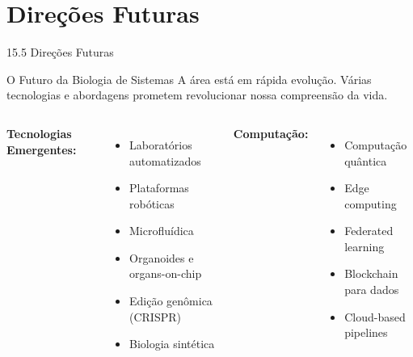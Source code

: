 \section{Direções Futuras}

\begin{frame}{15.5 Direções Futuras}
\begin{block}{O Futuro da Biologia de Sistemas}
A área está em rápida evolução. Várias tecnologias e abordagens prometem revolucionar nossa compreensão da vida.
\end{block}

\begin{columns}
\textbf{Tecnologias Emergentes:}
\begin{itemize}
    \item Laboratórios automatizados
    \item Plataformas robóticas
    \item Microfluídica
    \item Organoides e organs-on-chip
    \item Edição genômica (CRISPR)
    \item Biologia sintética
\end{itemize}

\textbf{Computação:}
\begin{itemize}
    \item Computação quântica
    \item Edge computing
    \item Federated learning
    \item Blockchain para dados
    \item Cloud-based pipelines
\end{itemize}
\end{columns}
\end{frame}

